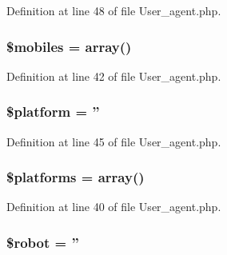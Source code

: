Definition at line 48 of file User\-\_\-agent.\-php.

\hypertarget{class_c_i___user__agent_a6928dde5aa0be443766d5b2376de908a}{
\subsubsection[{\$mobiles}]{\setlength{\rightskip}{0pt plus 5cm}\$mobiles = array()}}\label{class_c_i___user__agent_a6928dde5aa0be443766d5b2376de908a}


Definition at line 42 of file User\-\_\-agent.\-php.

\hypertarget{class_c_i___user__agent_a9cb2b1a2275f65f39415f0366139fb1c}{
\subsubsection[{\$platform}]{\setlength{\rightskip}{0pt plus 5cm}\${\bf platform} = ''}}\label{class_c_i___user__agent_a9cb2b1a2275f65f39415f0366139fb1c}


Definition at line 45 of file User\-\_\-agent.\-php.

\hypertarget{class_c_i___user__agent_a1c1a0a860242698ee6b3f4ef7d6eb343}{
\subsubsection[{\$platforms}]{\setlength{\rightskip}{0pt plus 5cm}\$platforms = array()}}\label{class_c_i___user__agent_a1c1a0a860242698ee6b3f4ef7d6eb343}


Definition at line 40 of file User\-\_\-agent.\-php.

\hypertarget{class_c_i___user__agent_aaf86508e45876d0081cadac4cb8a8808}{
\subsubsection[{\$robot}]{\setlength{\rightskip}{0pt plus 5cm}\${\bf robot} = ''}}\label{class_c_i___user__agent_aaf86508e45876d0081cadac4cb8a8808}


